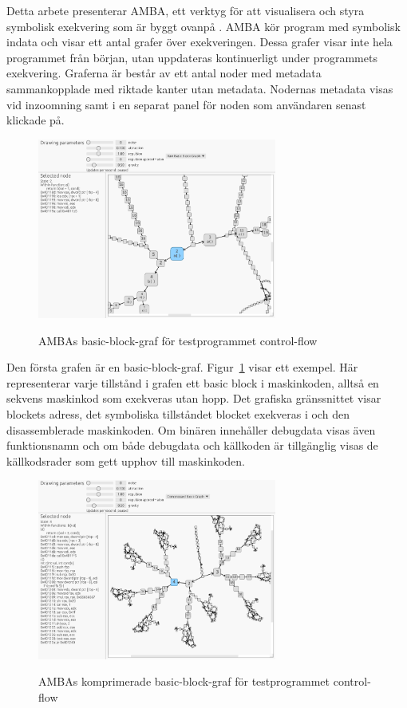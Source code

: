 \label{chap:amba}

Detta arbete presenterar AMBA, ett verktyg för att visualisera och styra
symbolisk exekvering som är byggt ovanpå \stoe{}. AMBA kör program med symbolisk
indata och visar ett antal grafer över exekveringen. Dessa grafer visar inte
hela programmet från början, utan uppdateras kontinuerligt under programmets
exekvering. Graferna är består av ett antal noder med metadata sammankopplade
med riktade kanter utan metadata. Nodernas metadata visas vid inzoomning samt i
en separat panel för noden som användaren senast klickade på.

\begin{figure}
    \centering
    \includegraphics[width=0.7\textwidth]{figures/graph_basic_block.png}\label{fig:graf-basic}
    \caption{AMBAs basic-block-graf för testprogrammet control-flow}
\end{figure}

Den första grafen är en basic-block-graf. Figur~\ref{fig:graf-basic} visar ett
exempel. Här representerar varje tillstånd i grafen ett basic block i
maskinkoden, alltså en sekvens maskinkod som exekveras utan hopp. Det grafiska
gränssnittet visar blockets adress, det symboliska tillståndet blocket exekveras
i och den disassemblerade maskinkoden. Om binären innehåller debugdata visas
även funktionsnamn och om både debugdata och källkoden är tillgänglig visas de
källkodsrader som gett upphov till maskinkoden.

\begin{figure}
    \centering
    \includegraphics[width=0.7\textwidth]{figures/graph_block_compressed.png}\label{fig:graf-compressed}
    \caption{AMBAs komprimerade basic-block-graf för testprogrammet control-flow}
\end{figure}


